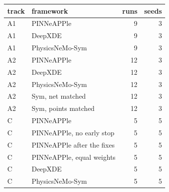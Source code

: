 \begin{tabular}{llrr}
\toprule
track & framework & runs & seeds \\
\midrule
A1 & PINNeAPPle & 9 & 3 \\
A1 & DeepXDE & 9 & 3 \\
A1 & PhysicsNeMo-Sym & 9 & 3 \\
A2 & PINNeAPPle & 12 & 3 \\
A2 & DeepXDE & 12 & 3 \\
A2 & PhysicsNeMo-Sym & 12 & 3 \\
A2 & Sym, net matched & 12 & 3 \\
A2 & Sym, points matched & 12 & 3 \\
C & PINNeAPPle & 5 & 5 \\
C & PINNeAPPle, no early stop & 5 & 5 \\
C & PINNeAPPle after the fixes & 5 & 5 \\
C & PINNeAPPle, equal weights & 5 & 5 \\
C & DeepXDE & 5 & 5 \\
C & PhysicsNeMo-Sym & 5 & 5 \\
\bottomrule
\end{tabular}
